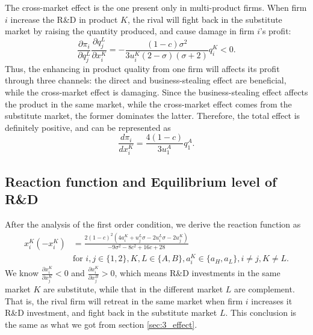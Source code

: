 \documentclass[12pt]{article}
\begin{document}
The cross-market effect is the one present only in multi-product firms.
When firm $i$ increase the R\&D in product $K$, the rival will fight back in the substitute market by raising the quantity produced, and cause damage in firm $i$'s profit: 
\begin{equation}
    \frac{\partial \pi_i}{\partial q_j^L}  \frac{\partial q_j^L}{\partial x_i^K} = - \frac{(1 - c) \sigma^2}{3 u_i^K  (2 - \sigma)  (\sigma + 2)} q_i^K < 0.
\end{equation}
Thus, the enhancing in product quality from one firm will affects its profit through three channels: the direct and business-stealing effect are beneficial, while the cross-market effect is damaging.
Since the business-stealing effect affects the product in the same market, while the cross-market effect comes from the substitute market, the former dominates the latter.
Therefore, the total effect is definitely positive, and can be represented as
\begin{equation}
    \frac{d \pi_i}{d x_i^K} = \frac{4 (1 - c)}{3 u_1^A} q_1^A.
\end{equation}


\subsection{Reaction function and Equilibrium level of R\&D}
After the analysis of the first order condition, we derive the reaction function as
\begin{equation}
    \begin{aligned}
    x_i^K (-x_i^K) &= \frac{2 (1 - c)^2  (4 a_i^K + u_j^L \sigma - 2 u_i^L \sigma - 2 u_j^K)}{- 9 \sigma^2 - 8 c^2 + 16 c + 28}\\
    & \text{for } i, j \in \{ 1,2 \}, K,L \in \{A,B\}, a_i^K \in \{a_H, a_L\}, i \neq j, K \neq L.
    \end{aligned}
\end{equation}
We know $\frac{\partial x_i^K}{\partial x_j^K} < 0$ and $\frac{\partial x_i^K}{\partial x_j^B} > 0$, which means R\&D investments in the same market $K$ are substitute, while that in the different market $L$ are complement.
That is, the rival firm will retreat in the same market when firm $i$ increases it R\&D investment, and fight back in the substitute market $L$.
This conclusion is the same as what we got from section \ref{sec:3_effect}.
\end{document}
